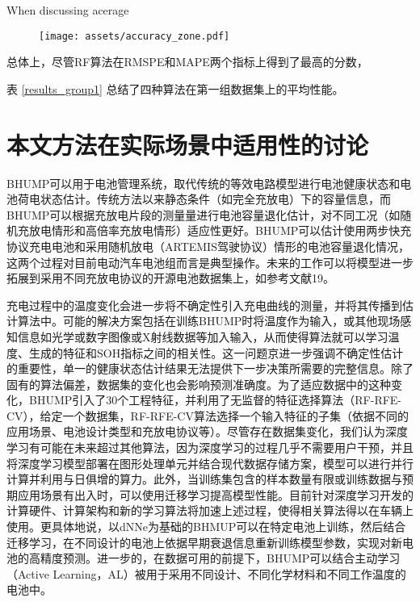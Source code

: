 \documentclass{article}
\begin{document}
When discussing acerage

\begin{figure}[h!]
    \centering
    \texttt{[image: assets/accuracy\_zone.pdf]}
    \label{accuracy_zone}
\end{figure}

总体上，尽管RF算法在RMSPE和MAPE两个指标上得到了最高的分数，

表 \ref{results_group1} 总结了四种算法在第一组数据集上的平均性能。

\section{本文方法在实际场景中适用性的讨论}

BHUMP可以用于电池管理系统，取代传统的等效电路模型进行电池健康状态和电池荷电状态估计。传统方法以来静态条件（如完全充放电）下的容量信息，而BHUMP可以根据充放电片段的测量量进行电池容量退化估计，对不同工况（如随机充放电情形和高倍率充放电情形）适应性更好。BHUMP可以估计使用两步快充协议充电电池和采用随机放电（ARTEMIS驾驶协议）情形的电池容量退化情况，这两个过程对目前电动汽车电池组而言是典型操作。未来的工作可以将模型进一步拓展到采用不同充放电协议的开源电池数据集上，如参考文献19。

充电过程中的温度变化会进一步将不确定性引入充电曲线的测量，并将其传播到估计算法中。可能的解决方案包括在训练BHUMP时将温度作为输入，或其他现场感知信息如光学或数字图像或X射线数据等加入输入，从而使得算法就可以学习温度、生成的特征和SOH指标之间的相关性。这一问题京进一步强调不确定性估计的重要性，单一的健康状态估计结果无法提供下一步决策所需要的完整信息。除了固有的算法偏差，数据集的变化也会影响预测准确度。为了适应数据中的这种变化，BHUMP引入了30个工程特征，并利用了无监督的特征选择算法（RF-RFE-CV），给定一个数据集，RF-RFE-CV算法选择一个输入特征的子集（依据不同的应用场景、电池设计类型和充放电协议等）。尽管存在数据集变化，我们认为深度学习有可能在未来超过其他算法，因为深度学习的过程几乎不需要用户干预，并且将深度学习模型部署在图形处理单元并结合现代数据存储方案，模型可以进行并行计算并利用与日俱增的算力。此外，当训练集包含的样本数量有限或训练数据与预期应用场景有出入时，可以使用迁移学习提高模型性能。目前针对深度学习开发的计算硬件、计算架构和新的学习算法将加速上述过程，使得相关算法得以在车辆上使用。更具体地说，以dNNe为基础的BHMUP可以在特定电池上训练，然后结合迁移学习，在不同设计的电池上依据早期衰退信息重新训练模型参数，实现对新电池的高精度预测。进一步的，在数据可用的前提下，BHUMP可以结合主动学习（Active Learning，AL）被用于采用不同设计、不同化学材料和不同工作温度的电池中。
\end{document}
